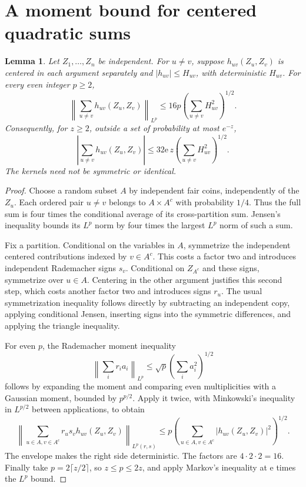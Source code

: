 \documentclass[11pt]{article}
\newtheorem{lemma}[theorem]{Lemma}
\theoremstyle{remark}
\begin{document}
\section{A moment bound for centered quadratic sums}\label{app:chaos}
\begin{lemma}\label{lem:chaos}
Let \(Z_1,\ldots,Z_n\) be independent. For \(u\ne v\), suppose
\(h_{uv}(Z_u,Z_v)\) is centered in each argument separately and
\(|h_{uv}|\le H_{uv}\), with deterministic \(H_{uv}\).
For every even integer \(p\ge2\),
\[
 \left\|\sum_{u\ne v}h_{uv}(Z_u,Z_v)\right\|_{L^p}
       \le16p\left(\sum_{u\ne v}H_{uv}^2\right)^{1/2}.
\]
Consequently, for \(z\ge2\), outside a set of probability at most \(e^{-z}\),
\[
 \left|\sum_{u\ne v}h_{uv}(Z_u,Z_v)\right|
       \le32\mathrm e\,z\left(\sum_{u\ne v}H_{uv}^2\right)^{1/2}.
\]
The kernels need not be symmetric or identical.
\end{lemma}
\begin{proof}
Choose a random subset \(A\) by independent fair coins, independently of
the \(Z_u\). Each ordered pair \(u\ne v\) belongs to \(A\times A^c\) with
probability \(1/4\). Thus the full sum is four times the conditional
average of its cross-partition sum. Jensen's inequality bounds its
\(L^p\) norm by four times the largest \(L^p\) norm of such a sum.

Fix a partition. Conditional on the variables in \(A\), symmetrize the
independent centered contributions indexed by \(v\in A^c\). This costs
a factor two and introduces independent Rademacher signs \(s_v\).
Conditional on \(Z_{A^c}\) and these signs, symmetrize over \(u\in A\).
Centering in the other argument justifies this second step, which costs
another factor two and introduces signs \(r_u\).
The usual symmetrization inequality follows directly by subtracting an
independent copy, applying conditional Jensen, inserting signs into the
symmetric differences, and applying the triangle inequality.

For even \(p\), the Rademacher moment inequality
\[
 \left\|\sum_i r_i a_i\right\|_{L^p}
       \le\sqrt p\left(\sum_i a_i^2\right)^{1/2}
\]
follows by expanding the moment and comparing even multiplicities with a
Gaussian moment, bounded by \(p^{p/2}\).
Apply it twice, with Minkowski's inequality in \(L^{p/2}\) between
applications, to obtain
\[
 \left\|\sum_{u\in A,v\in A^c}r_us_v h_{uv}(Z_u,Z_v)
        \right\|_{L^p(r,s)}
 \le p\left(\sum_{u\in A,v\in A^c}|h_{uv}(Z_u,Z_v)|^2\right)^{1/2}.
\]
The envelope makes the right side deterministic. The factors are
\(4\cdot2\cdot2=16\). Finally take \(p=2\lceil z/2\rceil\), so
\(z\le p\le2z\), and apply Markov's inequality at
\(\mathrm e\) times the \(L^p\) bound.
\end{proof}
\end{document}
